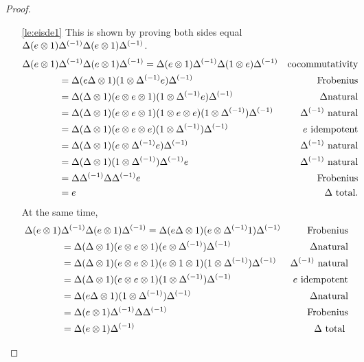 \begin{proof}
  \prepprooflist
  \begin{enumerate}[{(}i{)}]
    \item[\ref{le:eisde1}]This is shown by proving both sides
      equal $\Delta (e\otimes 1) {\Delta}^{(-1)} \Delta (e\otimes 1) {\Delta}^{(-1)}$.
      \begin{align*}
        \Delta (e\otimes 1) &{\Delta}^{(-1)} \Delta (e\otimes 1) {\Delta}^{(-1)}
        = \Delta (e\otimes 1) {\Delta}^{(-1)} \Delta (1\otimes e) {\Delta}^{(-1)}&\text{cocommutativity}\\
        &=\Delta(e \Delta \otimes 1) (1\otimes{\Delta}^{(-1)} e) {\Delta}^{(-1)} &\text{Frobenius}\\
        &=\Delta(\Delta \otimes 1) (e\otimes e\otimes1) (1\otimes{\Delta}^{(-1)}e){\Delta}^{(-1)}&\Delta\text{natural}\\
        &=\Delta(\Delta \otimes 1) (e\otimes e\otimes1) (1\otimes e\otimes e)(1\otimes{\Delta}^{(-1)}){\Delta}^{(-1)}&{\Delta}^{(-1)}\text{ natural}\\
        &=\Delta (\Delta \otimes1) (e\otimes e\otimes e)(1\otimes {\Delta}^{(-1)}){\Delta}^{(-1)}&e\text{ idempotent}\\
        &=\Delta (\Delta \otimes1) (e\otimes {\Delta}^{(-1)}e){\Delta}^{(-1)}&{\Delta}^{(-1)}\text{ natural}\\
        &=\Delta (\Delta \otimes1) (1\otimes {\Delta}^{(-1)}){\Delta}^{(-1)}e&{\Delta}^{(-1)}\text{ natural}\\
        &=\Delta {\Delta}^{(-1)}\Delta {\Delta}^{(-1)}e&\text{Frobenius}\\
        &=e&\Delta\text{ total}.
      \end{align*}
      At the same time,
      \begin{align*}
        \Delta (e\otimes 1) &{\Delta}^{(-1)} \Delta (e\otimes 1) {\Delta}^{(-1)}
        =\Delta(e \Delta \otimes 1) (e\otimes{\Delta}^{(-1)} 1) {\Delta}^{(-1)} &\text{Frobenius}\\
        &=\Delta(\Delta \otimes 1) (e\otimes e\otimes1) (e\otimes{\Delta}^{(-1)}){\Delta}^{(-1)}&\Delta\text{natural}\\
        &=\Delta(\Delta \otimes 1) (e\otimes e\otimes1) (e\otimes1\otimes1)(1\otimes{\Delta}^{(-1)}){\Delta}^{(-1)}&{\Delta}^{(-1)}\text{ natural}\\
        &=\Delta (\Delta \otimes1) (e\otimes e\otimes 1)(1\otimes {\Delta}^{(-1)}){\Delta}^{(-1)}&e\text{ idempotent}\\
        &=\Delta  (e\Delta\otimes 1)(1\otimes{\Delta}^{(-1)}){\Delta}^{(-1)}&\Delta\text{natural}\\
        &=\Delta (e \otimes 1) {\Delta}^{(-1)}\Delta{\Delta}^{(-1)} &\text{Frobenius}\\
        &=\Delta (e \otimes 1) {\Delta}^{(-1)} &\Delta\text{ total}\
      \end{align*}

\end{enumerate}
\end{proof}
